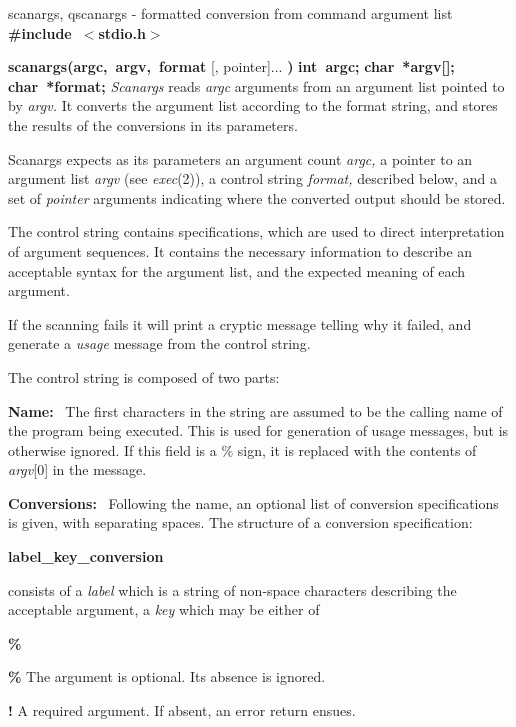 scanargs, qscanargs - formatted conversion from command argument list
{\bf \#include\ $<$stdio.h$>$}
\par
{\bf scanargs(argc,\ argv,\ format} 
[, pointer]...
{\bf )}
\nwl
{\bf int\ argc;}
\nwl
{\bf char\ *argv[];}
\nwl
{\bf char\ *format;}
{\it Scanargs}
reads
{\it argc}
arguments from an argument list pointed to by
{\it argv.}
It converts the argument list according to the format string,
and stores the results of the conversions in its parameters.
\par
Scanargs expects as its parameters an argument count
{\it argc,}
a pointer to an argument list 
{\it argv}
(see 
{\it exec}{\rm (2)),}
a control string
{\it format,}
described below, and a set of
{\it pointer}
arguments indicating where the converted output should be stored.
\par
The control string contains specifications, which are used to direct
interpretation of argument sequences.  It contains
the necessary information to describe an acceptable 
syntax for the argument list, and the expected meaning of each argument.
\par
If the scanning fails it will print a cryptic 
message telling why it failed, and generate a 
{\it usage}
message from the control string.
\par
The control string is composed of two parts:
\par
{\bf Name:} \ 
The first characters in the string are assumed to be the calling 
name of the program being executed. This is used for generation of
usage messages, but is otherwise ignored.
If this field is a \% sign, it is replaced with the contents of
{\it argv}{\rm [0]}
in the message.
\par
{\bf Conversions:} \ 
Following the name, an optional list of conversion specifications is given,
with separating spaces.  The structure of a conversion specification:
\ind{1\parindent}
\par
{\bf label\_key\_conversion}
\par
consists of a
{\it label}
which is a string of non-space characters describing the acceptable
argument, a
{\it key}
which may be either of
\begin{TPlist}{{\bf \%}}
\item[{{\bf \%}}]
The argument is optional. Its absence is ignored.
\item[{{\bf !}}]
A required argument. If absent, an error return ensues.
\end{TPlist}\par
